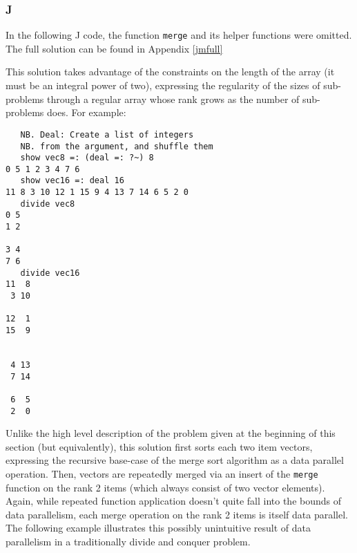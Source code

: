 \subsubsection{J}
\label{jmerge}
In the following J code, the function \texttt{merge} and its helper functions were omitted.
The full solution can be found in Appendix \ref{jmfull}

\begin{singlespacing}
\begin{small}

\end{small}
\end{singlespacing}

This solution takes advantage of the constraints on the length of the array (it must be an integral power of two), 
expressing the regularity of the sizes of sub-problems through a regular array 
whose rank grows as the number of sub-problems does.
For example: 

\begin{singlespacing}
\begin{small}
\begin{verbatim}
   NB. Deal: Create a list of integers
   NB. from the argument, and shuffle them
   show vec8 =: (deal =: ?~) 8
0 5 1 2 3 4 7 6
   show vec16 =: deal 16
11 8 3 10 12 1 15 9 4 13 7 14 6 5 2 0
   divide vec8
0 5
1 2

3 4
7 6
   divide vec16
11  8
 3 10

12  1
15  9


 4 13
 7 14

 6  5
 2  0
\end{verbatim}
\end{small}
\end{singlespacing}

Unlike the high level description of the problem given at the beginning of this section (but equivalently), 
this solution first sorts each two item vectors, 
expressing the recursive base-case of the merge sort algorithm as a data parallel operation.
Then, vectors are repeatedly merged via an insert of the \texttt{merge} function on the rank 2 items 
(which always consist of two vector elements).
Again, while repeated function application doesn't quite fall into the bounds of data parallelism, 
each merge operation on the rank 2 items is itself data parallel. 
The following example illustrates this possibly unintuitive result of data parallelism 
in a traditionally divide and conquer problem.

